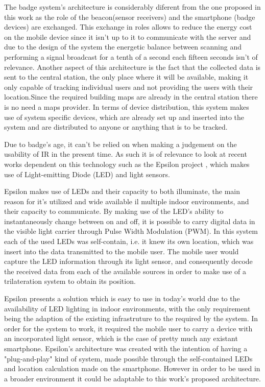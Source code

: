 	The badge system's architecture is considerably diferent from the one proposed in this work as the role of the beacon(sensor receivers) and the smartphone (badge devices) are exchanged. This exchange in roles allows to reduce the energy cost on the mobile device since it isn't up to it to communicate with the server and due to the design of the system the energetic balance between scanning and performing a signal broadcast for a tenth of a second each fifteen seconds isn't of relevance. Another aspect of this architecture is the fact that the collected data is sent to the central station, the only place where it will be available, making it only capable of tracking individual users and not providing the users with their location.Since the required building maps are already in the central station there is no need a maps provider. In terms of device distribution, this system makes use of system specific devices, which are already set up and inserted into the system and are distributed to anyone or anything that is to be tracked.

	Due to badge's age, it can't be relied on when making a judgement on the usability of \ac{IR} in the present time. As such it is of relevance to look at recent works dependent on this technology such as the Epsilon project \cite{epsilon}, which makes use of Light-emitting Diode (LED) and light sensors.  

	Epsilon makes use of LEDs and their capacity to both illuminate, the main reason for it's utilized and wide available il multiple indoor environments, and their capacity to communicate. By making use of the LED's ability to instantaneously change between on and off, it is possible to carry digital data in the visible light carrier through Pulse Width Modulation (PWM). In this system each of the used LEDs was self-contain, i.e. it knew its own location, which was insert into the data transmitted to the mobile user. The mobile user would capture the LED information through its light sensor, and consequently decode the received data from each of the available sources in order to make use of a trilateration system to obtain its position.

	Epsilon presents a solution which is easy to use in today's world due to the availability of LED lighting in indoor environments, with the only requirement being the adaption of the existing infrastruture to the required by the system. In order for the system to work, it required the mobile user to carry a device with an incorporated light sensor, which is the case of pretty much any existant smartphone.
	Epsilon's architecture was created with the intention of having a "plug-and-play" kind of system, made possible through the self-contained LEDs and location calculation made on the smartphone. However in order to be used in a broader environment it could be adaptable to this work's proposed architecture.

